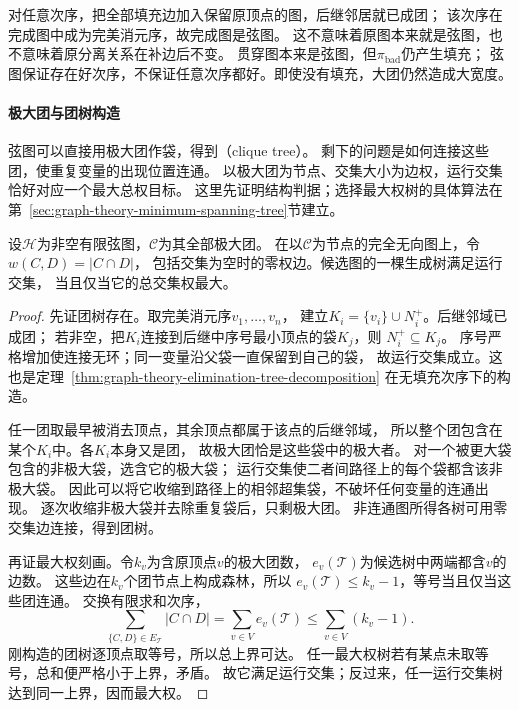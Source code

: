 对任意次序，把全部填充边加入保留原顶点的图，后继邻居就已成团；
该次序在完成图中成为完美消元序，故完成图是弦图。
这不意味着原图本来就是弦图，也不意味着原分离关系在补边后不变。
贯穿图本来是弦图，但\(\pi_{\mathrm{bad}}\)仍产生填充；
弦图保证存在好次序，不保证任意次序都好。即使没有填充，大团仍然造成大宽度。

\paragraph{极大团与团树构造}
\label{sec:graph-theory-clique-trees}

弦图可以直接用极大团作袋，得到（clique tree）。
剩下的问题是如何连接这些团，使重复变量的出现位置连通。
以极大团为节点、交集大小为边权，运行交集恰好对应一个最大总权目标。
这里先证明结构判据；选择最大权树的具体算法在
第~\ref{sec:graph-theory-minimum-spanning-tree}节建立。

\begin{theorem}[最大权生成树与团树]
  \label{thm:graph-theory-clique-tree-maximum-weight}
  设\(\mathcal H\)为非空有限弦图，\(\mathcal C\)为其全部极大团。
  在以\(\mathcal C\)为节点的完全无向图上，令\(w(C,D)=|C\cap D|\)，
  包括交集为空时的零权边。候选图的一棵生成树满足运行交集，
  当且仅当它的总交集权最大。
\end{theorem}

\begin{proof}
先证团树存在。取完美消元序\(v_1,\ldots,v_n\)，
建立\(K_i=\{v_i\}\cup N_i^+\)。后继邻域已成团；
若非空，把\(K_i\)连接到后继中序号最小顶点的袋\(K_j\)，则
\(N_i^+\subseteq K_j\)。
序号严格增加使连接无环；同一变量沿父袋一直保留到自己的袋，
故运行交集成立。这也是定理~\ref{thm:graph-theory-elimination-tree-decomposition}
在无填充次序下的构造。

任一团取最早被消去顶点，其余顶点都属于该点的后继邻域，
所以整个团包含在某个\(K_i\)中。各\(K_i\)本身又是团，
故极大团恰是这些袋中的极大者。
对一个被更大袋包含的非极大袋，选含它的极大袋；
运行交集使二者间路径上的每个袋都含该非极大袋。
因此可以将它收缩到路径上的相邻超集袋，不破坏任何变量的连通出现。
逐次收缩非极大袋并去除重复袋后，只剩极大团。
非连通图所得各树可用零交集边连接，得到团树。

再证最大权刻画。令\(k_v\)为含原顶点\(v\)的极大团数，
\(e_v(\mathcal T)\)为候选树中两端都含\(v\)的边数。
这些边在\(k_v\)个团节点上构成森林，所以
\(e_v(\mathcal T)\leq k_v-1\)，等号当且仅当这些团连通。
交换有限求和次序，
\[
  \sum_{\{C,D\}\in E_{\mathcal T}}|C\cap D|
  =\sum_{v\in V}e_v(\mathcal T)
  \leq\sum_{v\in V}(k_v-1).
\]
刚构造的团树逐顶点取等号，所以总上界可达。
任一最大权树若有某点未取等号，总和便严格小于上界，矛盾。
故它满足运行交集；反过来，任一运行交集树达到同一上界，因而最大权。
\end{proof}

